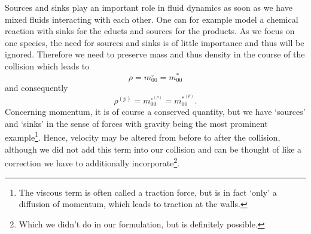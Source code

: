 Sources and sinks play an important role in fluid dynamics as soon as we have mixed fluids interacting with each other.
One can for example model a chemical reaction with sinks for the educts and sources for the products.
As we focus on one species, the need for sources and sinks is of little importance and thus will be ignored.
Therefore we need to preserve mass and thus density in the course of the collision which leads to
\begin{equation*}
    \rho  = m_{00}^\circ = m_{00}^*
\end{equation*}
and consequently
\begin{equation}
  \label{eq: absence of sources}
    \rho^{(p)} = m_{00}^{\circ^{(p)}} = m_{00}^{*^{(p)}}.
\end{equation}
Concerning momentum, it is of course a conserved quantity, but we have `sources' and `sinks' in the sense of forces with gravity being the most prominent example\footnote{The viscous term is often called a traction force, but is in fact `only' a diffusion of momentum, which leads to traction at the walls.}.
Hence, velocity may be altered from before to after the collision, although we did not add this term into our collision and can be thought of like a correction we have to additionally incorporate\footnote{Which we didn't do in our formulation, but is definitely possible.}.
